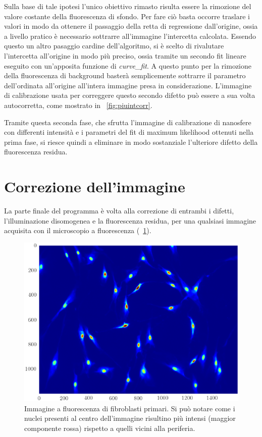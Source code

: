 Sulla base di tale ipotesi l'unico obiettivo rimasto risulta essere la rimozione del valore costante della fluorescenza di sfondo. 
Per fare ciò basta occorre traslare i valori in modo da ottenere il passaggio della retta di regressione dall'origine, ossia a livello pratico è necessario sottrarre all'immagine l'intercetta calcolata. 
Essendo questo un altro pasaggio cardine dell'algoritmo, si è scelto di rivalutare l'intercetta all'origine in modo più preciso, ossia tramite un secondo fit lineare eseguito con un'apposita funzione di \textit{curve\_fit}.
A questo punto per la rimozione della fluorescenza di background basterà semplicemente sottrarre il parametro dell'ordinata all'origine all'intera immagine presa in considerazione. 
L'immagine di calibrazione usata per correggere questo secondo difetto può essere a sua volta autocorretta, come mostrato in \figurename~\ref{fig:piuintcorr}.

Tramite questa seconda fase, che sfrutta l'immagine di calibrazione di nanosfere con differenti intensità e i parametri del fit di maximum likelihood ottenuti nella prima fase, si riesce quindi a eliminare in modo sostanziale l'ulteriore difetto della fluorescenza residua. 


\section{Correzione dell'immagine}

La parte finale del programma è volta alla correzione di entrambi i difetti, l'illuminazione disomogenea e la fluorescenza residua, per una qualsiasi immagine acquisita con il microscopio a fluorescenza (\figurename~\ref{fig:cell}). 

\begin{figure}[p]
 \centering
 \includegraphics[scale=.64]{img/CAP3cell.png}
 \caption{\small{Immagine a fluorescenza di fibroblasti primari. Si può notare come i nuclei presenti al centro dell'immagine risultino più intensi (maggior componente rossa) rispetto a quelli vicini alla periferia.}}
 \label{fig:cell}
\end{figure}


